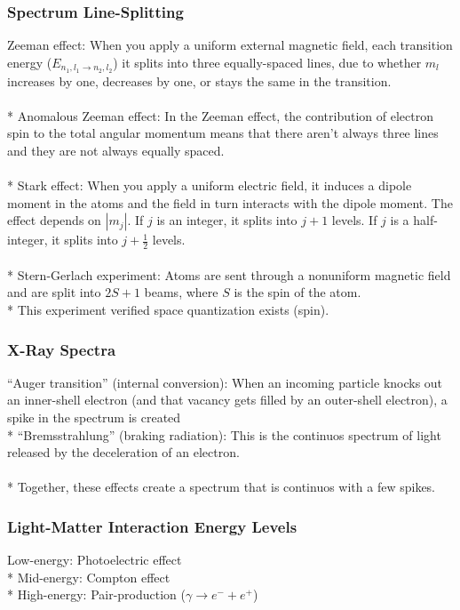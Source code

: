 \subsubsection{Spectrum Line-Splitting}

Zeeman effect: When you apply a uniform external magnetic field, each transition energy (\(E_{n_1,l_1\rightarrow n_2,l_2}\)) it splits into three equally-spaced lines, due to whether \(m_l\) increases by one, decreases by one, or stays the same in the transition.\\\\*
Anomalous Zeeman effect: In the Zeeman effect, the contribution of electron spin to the total angular momentum means that there aren't always three lines and they are not always equally spaced.\\\\*
Stark effect: When you apply a uniform electric field, it induces a dipole moment in the atoms and the field in turn interacts with the dipole moment. The effect depends on \(|m_j|\). If \(j\) is an integer, it splits into \(j+1\) levels. If \(j\) is a half-integer, it splits into \(j+\frac{1}{2}\) levels.\\\\*
Stern-Gerlach experiment: Atoms are sent through a nonuniform magnetic field and are split into \(2S+1\) beams, where \(S\) is the spin of the atom.\\*
This experiment verified space quantization exists (spin).

\subsubsection{X-Ray Spectra}
``Auger transition'' (internal conversion): When an incoming particle knocks out an inner-shell electron (and that vacancy gets filled by an outer-shell electron), a spike in the spectrum is created\\*
``Bremsstrahlung'' (braking radiation): This is the continuos spectrum of light released by the deceleration of an electron.\\\\*
Together, these effects create a spectrum that is continuos with a few spikes.

\subsubsection{Light-Matter Interaction Energy Levels}
Low-energy: Photoelectric effect\\*
Mid-energy: Compton effect\\*
High-energy: Pair-production (\(\gamma\rightarrow e^-+e^+\))

